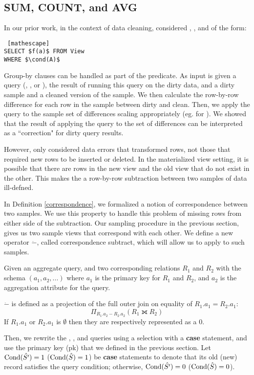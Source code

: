 \subsection{SUM, COUNT, and AVG}
In our prior work, in the context of data cleaning, \nsc considered \sumfunc, \countfunc, and \avgfunc of the form:
\begin{lstlisting} [mathescape]
SELECT $f(a)$ FROM View 
WHERE $\cond(A)$
\end{lstlisting}
Group-by clauses can be handled as part of the predicate.
As input \nsc is given a query (\sumfunc, \countfunc, or \avgfunc), the result of running this query on the dirty data, and a dirty sample and a cleaned version of the sample.
We then calculate the row-by-row difference for each row in the sample between dirty and clean.
Then, we apply the query to the sample set of differences scaling appropriately (eg. for \sumfunc).
We showed that the result of applying the query to the set of differences can be interpreted as a ``correction" for dirty query results.

However, \nsc only considered data errors that transformed rows, not those that required new rows to be inserted or deleted.
In the materialized view setting, it is possible that there are rows in the new view and the old view that do not exist in the other.
This makes the a row-by-row subtraction between two samples of data ill-defned. 

In Definition \ref{correspondence}, we formalized a notion of correspondence between two samples.
We use this property to handle this problem of missing rows from either side of the subtraction.
Our sampling procedure in the previous section, gives us two sample views that correspond with each other.
We define a new operator $\dot{-}$, called correspondence subtract, which will allow us to apply \nsc to such samples.
\begin{definition} Given an aggregate query, and two corresponding relations $R_1$ and $R_2$ with the schema $(a_1, a_2, ...)$ where $a_1$ is the primary key for $R_1$ and $R_2$, and $a_2$ is the aggregation attribute for the query. 

$\dot{-}$ is defined as a projection of the full outer join on equality of $R_1.a_1 = R_2.a_1$: \[ \Pi_{R_1.a_2 - R_2.a_2} ( R_1 \fullouterjoin R_2 ) \]
If $R_1.a_1$ or $R_2.a_1$ is $\emptyset$ then they are respectively represented as a $0$.
\end{definition}

Then, we rewrite the \sumfunc, \countfunc, and \avgfunc queries using a selection with a \textbf{case} statement, and use the primary key (pk) that we defined in the previous section.
Let $\textrm{Cond}(\hat{S'})=1$ ($\textrm{Cond}(\hat{S})=1$) be \textbf{case} statements to denote that its old (new) record satisfies the query condition; otherwise, $\textrm{Cond}(\hat{S'})=0$ ($\textrm{Cond}(\hat{S})=0$). 

